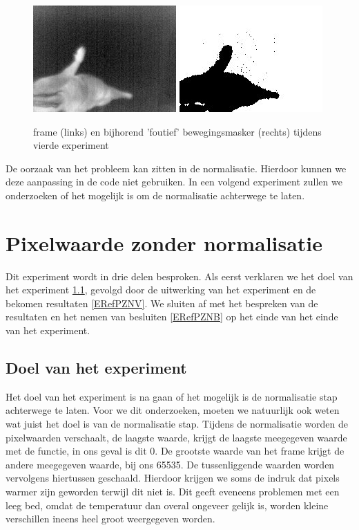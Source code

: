 \begin{figure}[hbp]
	\includegraphics[scale = 0.75]{VierdeExperiment_frame}
	\includegraphics[scale = 0.75]{VierdeExperiment_movMask}
	\caption{frame (links) en bijhorend 'foutief' bewegingsmasker (rechts) tijdens vierde experiment}
	\label{imgRVB}
\end{figure}
De oorzaak van het probleem kan zitten in de normalisatie. Hierdoor kunnen we deze aanpassing in de code niet gebruiken. In een volgend experiment zullen we onderzoeken of het mogelijk is om de normalisatie achterwege te laten.
 
 \section{Pixelwaarde zonder normalisatie}
 \label{ERefPZN}
Dit experiment wordt in drie delen besproken. Als eerst verklaren we het doel van het experiment \ref{ERefPZND}, gevolgd door de uitwerking van het experiment en de bekomen resultaten \ref{ERefPZNV}. We sluiten af met het bespreken van de resultaten en het nemen van besluiten \ref{ERefPZNB} op het einde van het einde van het experiment.

\subsection{Doel van het experiment}
\label{ERefPZND}
Het doel van het experiment is na gaan of het mogelijk is de normalisatie stap achterwege te laten. Voor we dit onderzoeken, moeten we natuurlijk ook weten wat juist het doel is van de normalisatie stap. Tijdens de normalisatie worden de pixelwaarden verschaalt, de laagste waarde, krijgt de laagste meegegeven waarde met de functie, in ons geval is dit 0. De grootste waarde van het frame krijgt de andere meegegeven waarde, bij ons 65535. De tussenliggende waarden worden vervolgens hiertussen geschaald. Hierdoor krijgen we soms de indruk dat pixels warmer zijn geworden terwijl dit niet is. Dit geeft eveneens problemen met een leeg bed, omdat de temperatuur dan overal ongeveer gelijk is, worden kleine verschillen ineens heel groot weergegeven worden.
 
